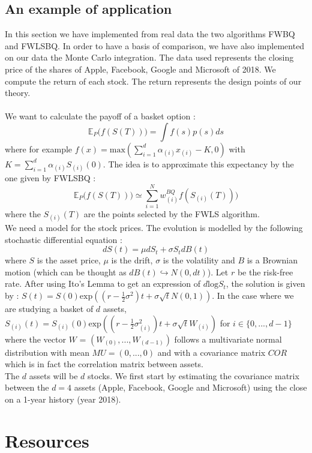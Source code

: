 \subsection{An example of application}
In this section we have implemented from real data the two algorithms FWBQ and FWLSBQ. In order to have a basis of comparison, we have also implemented on our data the Monte Carlo integration. The data used represents the closing price of the shares of Apple, Facebook, Google and Microsoft of 2018. We compute the return of each stock. The return represents the design points of our theory. \\ \\
We want to calculate the payoff of a basket option : $$ \mathbb{E}_P \Big( f(S(T)) \Big) = \int f(s) p(s) ds $$ where for example $f(x) = \text{max} ( \sum_{i = 1}^{d} \alpha_{(i)} x_{(i)} - K, 0) $ with $K = \sum_{i = 1}^{d} \alpha_{(i)} S_{(i)}(0) $. The idea is to approximate this expectancy by the one given by FWLSBQ : $$ \mathbb{E}_P \Big( f(S(T)) \Big) \simeq \sum_{i = 1}^{N} w_{(i)}^{BQ} f(S_{(i)}(T))) $$ where the $S_{(i)}(T)$ are the points selected by the FWLS algorithm. \\
We need a model for the stock prices. The evolution is modelled by the following stochastic differential equation : $$ dS(t) = \mu dS_t + \sigma S_t dB(t) $$ where $S$ is the asset price, $\mu$ is the drift, $\sigma$ is the volatility and $B$ is a Brownian motion (which can be thought as $dB(t) \hookrightarrow N(0, dt)$). Let $r$ be the risk-free rate. After using Ito's Lemma to get an expression of $d\text{log}S_t$, the solution is given by : $S(t) = S(0) \text{exp} ((r-\frac{1}{2}\sigma^2)t + \sigma \sqrt{t} N(0, 1) )$. In the case where we are studying a basket of $d$ assets, $S_{(i)}(t) = S_{(i)}(0) \text{exp} ((r-\frac{1}{2}\sigma_{(i)}^2)t + \sigma \sqrt{t} W_{(i)} )$ for $i \in \{0, ..., d-1\}$ where the vector $W$ = $(W_{(0)}, ..., W_{(d-1)})$ follows a multivariate normal distribution with mean $MU = (0, ..., 0)$ and with a covariance matrix $COR$ which is in fact the correlation matrix between assets. \\
The $d$ assets will be $d$ stocks. We first start by estimating the covariance matrix between the $d = 4$ assets (Apple, Facebook, Google and Microsoft) using the close on a 1-year history (year 2018).


\section*{Resources}
\label{sec:bibli}

\nocite{*}
\printbibliography[heading=none]
